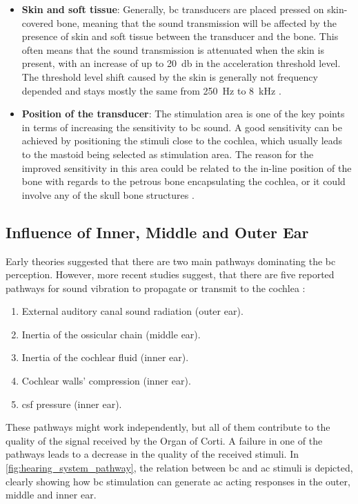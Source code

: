 \begin{itemize}
\item \textbf{Skin and soft tissue}: Generally, \gls{bc} transducers are placed pressed on skin-covered bone, meaning that the sound transmission will be affected by the presence of skin and soft tissue between the transducer and the bone. This often means that the sound transmission is attenuated when the skin is present, with an increase of up to \SI{20}{\decibel} in the acceleration threshold level. The threshold level shift caused by the skin is generally not frequency depended and stays mostly the same from \SI{250}{\hertz} to \SI{8}{\kilo\hertz} \citep{hakansson_1985}.
\item \textbf{Position of the transducer}: The stimulation area is one of the key points in terms of increasing the sensitivity to \gls{bc} sound. A good sensitivity can be achieved by positioning the stimuli close to the cochlea, which usually leads to the mastoid being selected as stimulation area. The reason for the improved sensitivity in this area could be related to the in-line position of the bone with regards to the petrous bone encapsulating the cochlea, or it could involve any of the skull bone structures \citep{puria_2013}. 
\end{itemize}
\subsection{Influence of Inner, Middle and Outer Ear}

Early theories suggested that there are two main pathways dominating the \gls{bc} perception. However, more recent studies suggest, that there are five reported pathways for sound vibration to propagate or transmit to the cochlea \citep{zhang_2016}:
\begin{enumerate}
\item External auditory canal sound radiation (outer ear).
\item Inertia of the ossicular chain (middle ear).
\item Inertia of the cochlear fluid (inner ear).
\item Cochlear walls' compression (inner ear).
\item \gls{csf} pressure (inner ear).
\end{enumerate}

These pathways might work independently, but all of them contribute to the quality of the signal received by the Organ of Corti. A failure in one of the pathways leads to a decrease in the quality of the received stimuli. In  \autoref{fig:hearing_system_pathway}, the relation between \gls{bc} and \gls{ac} stimuli is depicted, clearly showing how \gls{bc} stimulation can generate \gls{ac} acting responses in the outer, middle and inner ear.


